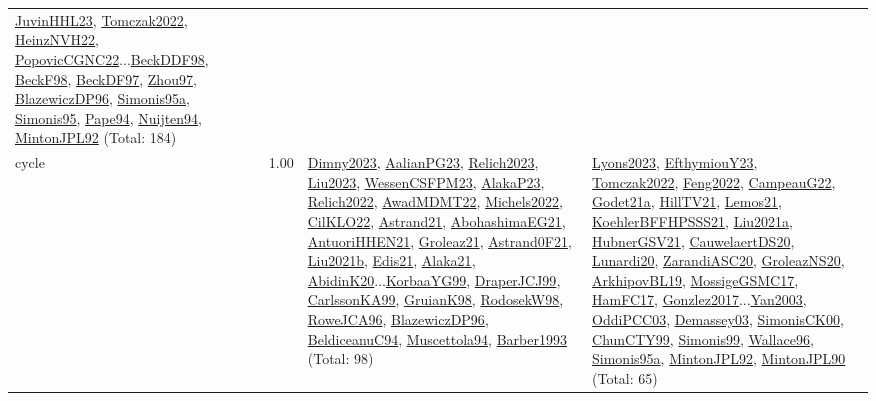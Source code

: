 {\begin{longtable}{p{3cm}r>{\raggedright\arraybackslash}p{6cm}>{\raggedright\arraybackslash}p{6cm}>{\raggedright\arraybackslash}p{8cm}}
\hyperref[detail:JuvinHHL23]{JuvinHHL23}, \hyperref[detail:Tomczak2022]{Tomczak2022}, \hyperref[detail:HeinzNVH22]{HeinzNVH22}, \hyperref[detail:PopovicCGNC22]{PopovicCGNC22}...\hyperref[detail:BeckDDF98]{BeckDDF98}, \hyperref[detail:BeckF98]{BeckF98}, \hyperref[detail:BeckDF97]{BeckDF97}, \hyperref[detail:Zhou97]{Zhou97}, \hyperref[detail:BlazewiczDP96]{BlazewiczDP96}, \hyperref[detail:Simonis95a]{Simonis95a}, \hyperref[detail:Simonis95]{Simonis95}, \hyperref[detail:Pape94]{Pape94}, \hyperref[detail:Nuijten94]{Nuijten94}, \hyperref[detail:MintonJPL92]{MintonJPL92} (Total: 184)\\
\index{cycle}\index{Constraints!cycle}cycle &  1.00 & \hyperref[detail:Dimny2023]{Dimny2023}, \hyperref[detail:AalianPG23]{AalianPG23}, \hyperref[detail:Relich2023]{Relich2023}, \hyperref[detail:Liu2023]{Liu2023}, \hyperref[detail:WessenCSFPM23]{WessenCSFPM23}, \hyperref[detail:AlakaP23]{AlakaP23}, \hyperref[detail:Relich2022]{Relich2022}, \hyperref[detail:AwadMDMT22]{AwadMDMT22}, \hyperref[detail:Michels2022]{Michels2022}, \hyperref[detail:CilKLO22]{CilKLO22}, \hyperref[detail:Astrand21]{Astrand21}, \hyperref[detail:AbohashimaEG21]{AbohashimaEG21}, \hyperref[detail:AntuoriHHEN21]{AntuoriHHEN21}, \hyperref[detail:Groleaz21]{Groleaz21}, \hyperref[detail:Astrand0F21]{Astrand0F21}, \hyperref[detail:Liu2021b]{Liu2021b}, \hyperref[detail:Edis21]{Edis21}, \hyperref[detail:Alaka21]{Alaka21}, \hyperref[detail:AbidinK20]{AbidinK20}...\hyperref[detail:KorbaaYG99]{KorbaaYG99}, \hyperref[detail:DraperJCJ99]{DraperJCJ99}, \hyperref[detail:CarlssonKA99]{CarlssonKA99}, \hyperref[detail:GruianK98]{GruianK98}, \hyperref[detail:RodosekW98]{RodosekW98}, \hyperref[detail:RoweJCA96]{RoweJCA96}, \hyperref[detail:BlazewiczDP96]{BlazewiczDP96}, \hyperref[detail:BeldiceanuC94]{BeldiceanuC94}, \hyperref[detail:Muscettola94]{Muscettola94}, \hyperref[detail:Barber1993]{Barber1993} (Total: 98) & \hyperref[detail:Lyons2023]{Lyons2023}, \hyperref[detail:EfthymiouY23]{EfthymiouY23}, \hyperref[detail:Tomczak2022]{Tomczak2022}, \hyperref[detail:Feng2022]{Feng2022}, \hyperref[detail:CampeauG22]{CampeauG22}, \hyperref[detail:Godet21a]{Godet21a}, \hyperref[detail:HillTV21]{HillTV21}, \hyperref[detail:Lemos21]{Lemos21}, \hyperref[detail:KoehlerBFFHPSSS21]{KoehlerBFFHPSSS21}, \hyperref[detail:Liu2021a]{Liu2021a}, \hyperref[detail:HubnerGSV21]{HubnerGSV21}, \hyperref[detail:CauwelaertDS20]{CauwelaertDS20}, \hyperref[detail:Lunardi20]{Lunardi20}, \hyperref[detail:ZarandiASC20]{ZarandiASC20}, \hyperref[detail:GroleazNS20]{GroleazNS20}, \hyperref[detail:ArkhipovBL19]{ArkhipovBL19}, \hyperref[detail:MossigeGSMC17]{MossigeGSMC17}, \hyperref[detail:HamFC17]{HamFC17}, \hyperref[detail:Gonzlez2017]{Gonzlez2017}...\hyperref[detail:Yan2003]{Yan2003}, \hyperref[detail:OddiPCC03]{OddiPCC03}, \hyperref[detail:Demassey03]{Demassey03}, \hyperref[detail:SimonisCK00]{SimonisCK00}, \hyperref[detail:ChunCTY99]{ChunCTY99}, \hyperref[detail:Simonis99]{Simonis99}, \hyperref[detail:Wallace96]{Wallace96}, \hyperref[detail:Simonis95a]{Simonis95a}, \hyperref[detail:MintonJPL92]{MintonJPL92}, \hyperref[detail:MintonJPL90]{MintonJPL90} (Total: 65) & 
\end{longtable}}
